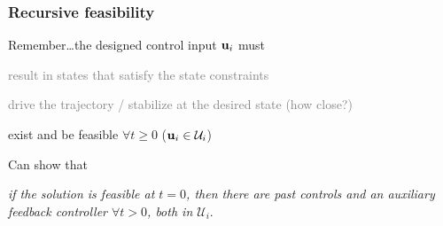 \begin{frame} %
  \frametitle{Recursive feasibility}

  Remember\dots the designed control input $\bm{\mathbf{u}}_i$ must\\[2ex]

  \begin{wideitemize}
    \item \textcolor{gray}{result in states that satisfy the state constraints} \\[2ex]
    \item \textcolor{gray}{drive the trajectory / stabilize at the desired state (how close?)} \\[2ex]
    \item exist and be feasible $\forall t \geq 0$ ($\bm{\mathbf{u}}_i \in \mathcal{U}_i$) \\[6ex]
  \end{wideitemize}

  Can show that

  \textit{if the solution is feasible at $t=0$, then there are past controls
  and an auxiliary feedback controller $\forall t > 0$, both in $\mathcal{U}_i$}.
\end{frame} %
